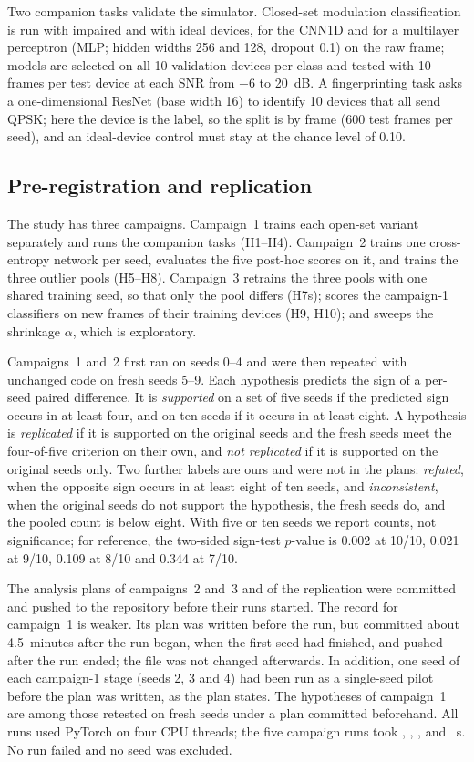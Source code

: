 \documentclass[journal]{IEEEtran}
\begin{document}
Two companion tasks validate the simulator. Closed-set modulation
classification is run with impaired and with ideal devices, for the CNN1D and
for a multilayer perceptron (MLP; hidden widths 256 and 128, dropout 0.1) on
the raw frame; models are selected on all 10 validation devices per class and
tested with 10 frames per test device at each SNR from $-6$ to 20~dB. A
fingerprinting task asks a one-dimensional ResNet \cite{he2016resnet} (base
width 16) to identify 10 devices that all send QPSK; here the device is the
label, so the split is by frame (600 test frames per seed), and an
ideal-device control must stay at the chance level of 0.10.

\subsection{Pre-registration and replication}
The study has three campaigns. Campaign~1 trains each open-set variant
separately and runs the companion tasks (H1--H4). Campaign~2 trains one
cross-entropy network per seed, evaluates the five post-hoc scores on it, and
trains the three outlier pools (H5--H8). Campaign~3 retrains the three pools
with one shared training seed, so that only the pool differs (H7s); scores
the campaign-1 classifiers on new frames of their training devices (H9, H10);
and sweeps the shrinkage $\alpha$, which is exploratory.

Campaigns~1 and~2 first ran on seeds 0--4 and were then repeated with
unchanged code on fresh seeds 5--9. Each hypothesis predicts the sign of a
per-seed paired difference. It is \emph{supported} on a set of five seeds if
the predicted sign occurs in at least four, and on ten seeds if it occurs in
at least eight. A hypothesis is \emph{replicated} if it is supported on the
original seeds and the fresh seeds meet the four-of-five criterion on their
own, and \emph{not replicated} if it is supported on the original seeds only.
Two further labels are ours and were not in the plans: \emph{refuted}, when
the opposite sign occurs in at least eight of ten seeds, and
\emph{inconsistent}, when the original seeds do not support the hypothesis,
the fresh seeds do, and the pooled count is below eight. With five or ten
seeds we report counts, not significance; for reference, the two-sided
sign-test $p$-value is 0.002 at 10/10, 0.021 at 9/10, 0.109 at 8/10 and 0.344
at 7/10.

The analysis plans of campaigns~2 and~3 and of the replication were committed
and pushed to the repository before their runs started. The record for
campaign~1 is weaker. Its plan was written before the run, but committed
about 4.5~minutes after the run began, when the first seed had finished, and
pushed after the run ended; the file was not changed afterwards. In
addition, one seed of each campaign-1 stage (seeds 2, 3 and 4) had been run
as a single-seed pilot before the plan was written, as the plan states. The
hypotheses of campaign~1 are among those retested on fresh seeds under a plan
committed beforehand. All runs used PyTorch on four CPU threads; the five
campaign runs took , ,
,  and ~s. No run
failed and no seed was excluded.
\end{document}
